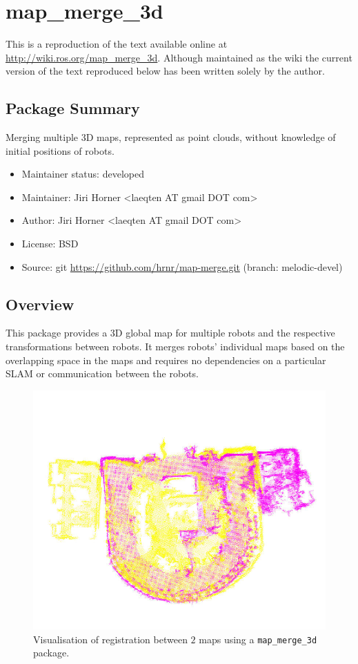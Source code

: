\chapter{map\_merge\_3d}
\label{chap:map_merge-wiki}

This is a reproduction of the text available online at \url{http://wiki.ros.org/map_merge_3d}. Although maintained as the wiki the current version of the text reproduced below has been written solely by the author.

\section{Package Summary}

Merging multiple \gls{3D} maps, represented as point clouds, without knowledge of initial positions of robots.

\begin{itemize}
    \item Maintainer status: developed
    \item Maintainer: Jiri Horner \textless laeqten AT gmail DOT com\textgreater
    \item Author: Jiri Horner \textless laeqten AT gmail DOT com\textgreater
    \item License: BSD
    \item Source: git \url{https://github.com/hrnr/map-merge.git} (branch: melodic-devel)
\end{itemize}


\section{Overview}

This package provides a \gls{3D} global map for multiple robots and the respective transformations between robots. It merges robots' individual maps based on the overlapping space in the maps and requires no dependencies on a particular \gls{SLAM} or communication between the robots.

\begin{figure}
    \centering
    \includegraphics[width=4.53in]{../img/screenshot.jpg}
    \caption[The merged map for $2$ robots.]{Visualisation of registration between $2$ maps using a \texttt{map\_merge\_3d} package.}
    \label{fig:mapmergescreenshot}
\end{figure}

